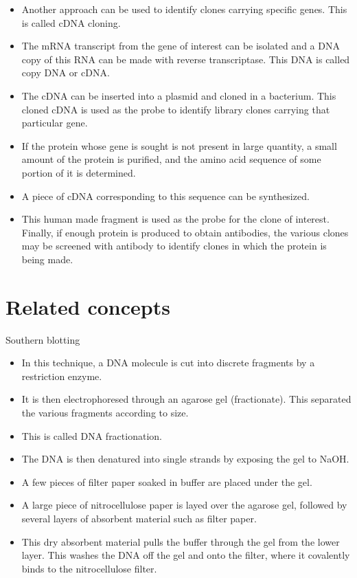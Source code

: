 \documentclass[11pt,dvipsnames,ignorenonframetext,aspectratio=169]{beamer}
\providecommand{\tightlist}{%
  \setlength{\itemsep}{0pt}\setlength{\parskip}{0pt}}
\begin{document}
\begin{frame}{}
\protect\hypertarget{section-27}{}

\begin{itemize}
\tightlist
\item
  Another approach can be used to identify clones carrying specific
  genes. This is called cDNA cloning.
\item
  The mRNA transcript from the gene of interest can be isolated and a
  DNA copy of this RNA can be made with reverse transcriptase. This DNA
  is called copy DNA or cDNA.
\item
  The cDNA can be inserted into a plasmid and cloned in a bacterium.
  This cloned cDNA is used as the probe to identify library clones
  carrying that particular gene.
\item
  If the protein whose gene is sought is not present in large quantity,
  a small amount of the protein is purified, and the amino acid sequence
  of some portion of it is determined.
\item
  A piece of cDNA corresponding to this sequence can be synthesized.
\item
  This human made fragment is used as the probe for the clone of
  interest. Finally, if enough protein is produced to obtain antibodies,
  the various clones may be screened with antibody to identify clones in
  which the protein is being made.
\end{itemize}

\end{frame}

\hypertarget{related-concepts}{%
\section{Related concepts}\label{related-concepts}}

\begin{frame}{Southern blotting}
\protect\hypertarget{southern-blotting}{}

\begin{itemize}
\tightlist
\item
  In this technique, a DNA molecule is cut into discrete fragments by a
  restriction enzyme.
\item
  It is then electrophoresed through an agarose gel (fractionate). This
  separated the various fragments according to size.
\item
  This is called DNA fractionation.
\item
  The DNA is then denatured into single strands by exposing the gel to
  NaOH.
\item
  A few pieces of filter paper soaked in buffer are placed under the
  gel.
\item
  A large piece of nitrocellulose paper is layed over the agarose gel,
  followed by several layers of absorbent material such as filter paper.
\item
  This dry absorbent material pulls the buffer through the gel from the
  lower layer. This washes the DNA off the gel and onto the filter,
  where it covalently binds to the nitrocellulose filter.
\end{itemize}

\end{frame}
\end{document}
